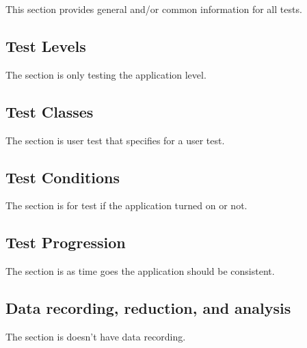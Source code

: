 


This section provides general and/or common information for all tests.

\subsection{Test Levels}
\label{loc:TestLevels}

The section is only testing the application level.

\subsection{Test Classes}
\label{loc:TestClasses}

The section is user test that specifies for a user test.


\subsection{Test Conditions}
\label{loc:TestConditions}

The section is for test if the application turned on or not.


\subsection{Test Progression}
\label{loc:TestProgression}

The section is as time goes the application should be consistent.

\subsection{Data recording, reduction, and analysis}
\label{loc:DataRecordingReductionAndAnalysis}

The section is doesn't have data recording.